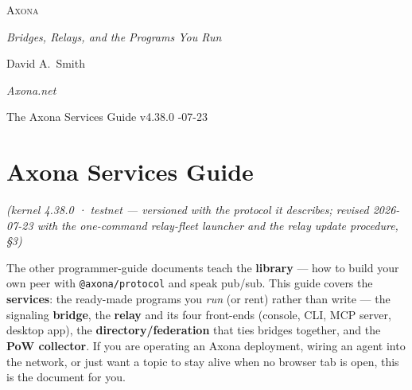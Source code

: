 \documentclass[
  nobib]{tufte-handout}
\author{}
\date{}
\begin{document}
\thispagestyle{empty}
\null\vfill
\begin{center}
{\fontsize{48}{52}\selectfont \textsc{Axona}\par}
\vspace{0.6em}
{\Large\itshape Bridges, Relays, and the Programs You Run\par}
\vspace{4em}
{\large David A.~Smith\par}
{\itshape\small Axona.net\par}
\vspace{2em}
{\small The Axona Services Guide \quad v4.38.0 -07-23\par}
\end{center}
\vfill
\null
\newpage
\pagestyle{ndhtplain}
\thispagestyle{ndhtplain}
\setcounter{page}{1}

\section{Axona Services Guide}\label{axona-services-guide}

\emph{(kernel 4.38.0 · testnet --- versioned with the protocol it
describes; revised 2026-07-23 with the one-command relay-fleet launcher
and the relay update procedure, §3)}

The other programmer-guide documents teach the \textbf{library} --- how
to build your own peer with \texttt{@axona/protocol} and speak pub/sub.
This guide covers the \textbf{services}: the ready-made programs you
\emph{run} (or rent) rather than write --- the signaling
\textbf{bridge}, the \textbf{relay} and its four front-ends (console,
CLI, MCP server, desktop app), the \textbf{directory/federation} that
ties bridges together, and the \textbf{PoW collector}. If you are
operating an Axona deployment, wiring an agent into the network, or just
want a topic to stay alive when no browser tab is open, this is the
document for you.
\end{document}
